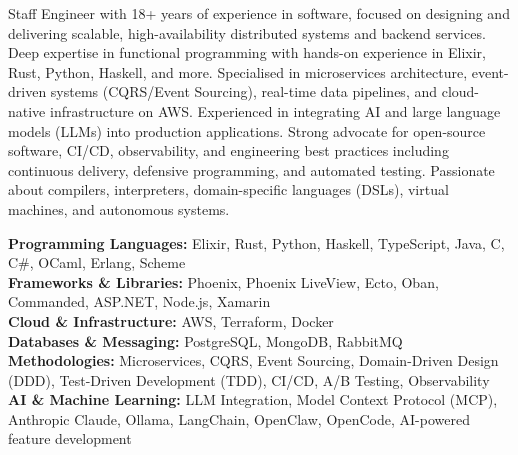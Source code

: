 \documentclass[9pt]{developercv}
\begin{document}
\begin{minipage}[t]{1.0\textwidth}
    \vspace{-\baselineskip}
    \raggedright
    Staff Engineer with 18+ years of experience in software, focused on designing and delivering scalable, high-availability distributed systems and backend services. Deep expertise in functional programming with hands-on experience in Elixir, Rust, Python, Haskell, and more. Specialised in microservices architecture, event-driven systems (CQRS/Event Sourcing), real-time data pipelines, and cloud-native infrastructure on AWS. Experienced in integrating AI and large language models (LLMs) into production applications. Strong advocate for open-source software, CI/CD, observability, and engineering best practices including continuous delivery, defensive programming, and automated testing. Passionate about compilers, interpreters, domain-specific languages (DSLs), virtual machines, and autonomous systems.
\end{minipage}



\begin{minipage}[t]{1.0\textwidth}
    \vspace{-\baselineskip}
    \raggedright
    \textbf{Programming Languages:} Elixir, Rust, Python, Haskell, TypeScript, Java, C, C\#, OCaml, Erlang, Scheme\\
    \textbf{Frameworks \& Libraries:} Phoenix, Phoenix LiveView, Ecto, Oban, Commanded, ASP.NET, Node.js, Xamarin\\
    \textbf{Cloud \& Infrastructure:} AWS, Terraform, Docker\\
    \textbf{Databases \& Messaging:} PostgreSQL, MongoDB, RabbitMQ\\
    \textbf{Methodologies:} Microservices, CQRS, Event Sourcing, Domain-Driven Design (DDD), Test-Driven Development (TDD), CI/CD, A/B Testing, Observability\\
    \textbf{AI \& Machine Learning:} LLM Integration, Model Context Protocol (MCP), Anthropic Claude, Ollama, LangChain, OpenClaw, OpenCode, AI-powered feature development\\
\end{minipage}

\end{document}
